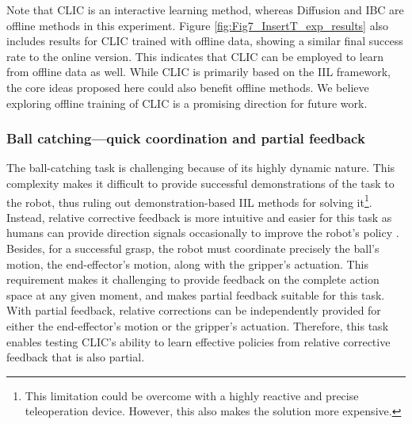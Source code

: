 Note that CLIC is an interactive learning method, whereas Diffusion and IBC are offline methods in this experiment. Figure \ref{fig:Fig7_InsertT_exp_results} also includes results for CLIC trained with offline data, showing a similar final success rate to the online version. This indicates that CLIC can be employed to learn from offline data as well.
While CLIC is primarily based on the IIL framework, the core ideas proposed here could also benefit offline methods. We believe exploring offline training of CLIC is a promising direction for future work.



\subsubsection{Ball catching—quick coordination and partial feedback}
 The ball-catching task is challenging because of its highly dynamic nature. 
This complexity makes it difficult to provide successful demonstrations of the task to the robot, thus ruling out demonstration-based IIL methods for solving it\footnote{This limitation could be overcome with a highly reactive and precise teleoperation device. However, this also makes the solution more expensive.}.
Instead, relative corrective feedback is more intuitive and easier for this task as humans can provide direction signals occasionally to improve the robot's policy \cite{2020_DCOACH_temporal}.  
Besides, for a successful grasp, the robot must coordinate precisely the ball's motion, the end-effector's motion, along with the gripper's actuation.
This requirement makes it challenging to provide feedback on the complete action space at any given moment, and makes partial feedback suitable for this task.
With partial feedback, relative corrections can be independently provided for either the end-effector's motion or the gripper's actuation.
Therefore, this task enables testing CLIC's ability to learn effective policies from relative corrective feedback that is also partial. 

